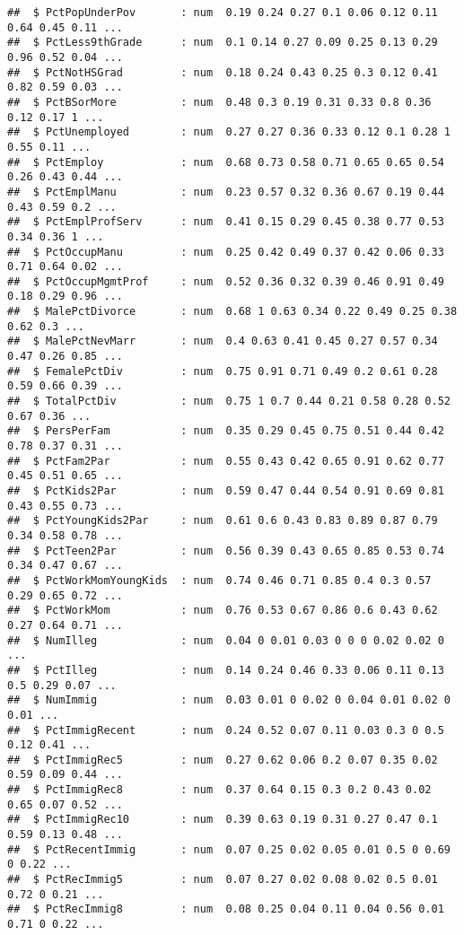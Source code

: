 \documentclass[
]{article}
\begin{document}
\begin{verbatim}
##  $ PctPopUnderPov       : num  0.19 0.24 0.27 0.1 0.06 0.12 0.11 0.64 0.45 0.11 ...
##  $ PctLess9thGrade      : num  0.1 0.14 0.27 0.09 0.25 0.13 0.29 0.96 0.52 0.04 ...
##  $ PctNotHSGrad         : num  0.18 0.24 0.43 0.25 0.3 0.12 0.41 0.82 0.59 0.03 ...
##  $ PctBSorMore          : num  0.48 0.3 0.19 0.31 0.33 0.8 0.36 0.12 0.17 1 ...
##  $ PctUnemployed        : num  0.27 0.27 0.36 0.33 0.12 0.1 0.28 1 0.55 0.11 ...
##  $ PctEmploy            : num  0.68 0.73 0.58 0.71 0.65 0.65 0.54 0.26 0.43 0.44 ...
##  $ PctEmplManu          : num  0.23 0.57 0.32 0.36 0.67 0.19 0.44 0.43 0.59 0.2 ...
##  $ PctEmplProfServ      : num  0.41 0.15 0.29 0.45 0.38 0.77 0.53 0.34 0.36 1 ...
##  $ PctOccupManu         : num  0.25 0.42 0.49 0.37 0.42 0.06 0.33 0.71 0.64 0.02 ...
##  $ PctOccupMgmtProf     : num  0.52 0.36 0.32 0.39 0.46 0.91 0.49 0.18 0.29 0.96 ...
##  $ MalePctDivorce       : num  0.68 1 0.63 0.34 0.22 0.49 0.25 0.38 0.62 0.3 ...
##  $ MalePctNevMarr       : num  0.4 0.63 0.41 0.45 0.27 0.57 0.34 0.47 0.26 0.85 ...
##  $ FemalePctDiv         : num  0.75 0.91 0.71 0.49 0.2 0.61 0.28 0.59 0.66 0.39 ...
##  $ TotalPctDiv          : num  0.75 1 0.7 0.44 0.21 0.58 0.28 0.52 0.67 0.36 ...
##  $ PersPerFam           : num  0.35 0.29 0.45 0.75 0.51 0.44 0.42 0.78 0.37 0.31 ...
##  $ PctFam2Par           : num  0.55 0.43 0.42 0.65 0.91 0.62 0.77 0.45 0.51 0.65 ...
##  $ PctKids2Par          : num  0.59 0.47 0.44 0.54 0.91 0.69 0.81 0.43 0.55 0.73 ...
##  $ PctYoungKids2Par     : num  0.61 0.6 0.43 0.83 0.89 0.87 0.79 0.34 0.58 0.78 ...
##  $ PctTeen2Par          : num  0.56 0.39 0.43 0.65 0.85 0.53 0.74 0.34 0.47 0.67 ...
##  $ PctWorkMomYoungKids  : num  0.74 0.46 0.71 0.85 0.4 0.3 0.57 0.29 0.65 0.72 ...
##  $ PctWorkMom           : num  0.76 0.53 0.67 0.86 0.6 0.43 0.62 0.27 0.64 0.71 ...
##  $ NumIlleg             : num  0.04 0 0.01 0.03 0 0 0 0.02 0.02 0 ...
##  $ PctIlleg             : num  0.14 0.24 0.46 0.33 0.06 0.11 0.13 0.5 0.29 0.07 ...
##  $ NumImmig             : num  0.03 0.01 0 0.02 0 0.04 0.01 0.02 0 0.01 ...
##  $ PctImmigRecent       : num  0.24 0.52 0.07 0.11 0.03 0.3 0 0.5 0.12 0.41 ...
##  $ PctImmigRec5         : num  0.27 0.62 0.06 0.2 0.07 0.35 0.02 0.59 0.09 0.44 ...
##  $ PctImmigRec8         : num  0.37 0.64 0.15 0.3 0.2 0.43 0.02 0.65 0.07 0.52 ...
##  $ PctImmigRec10        : num  0.39 0.63 0.19 0.31 0.27 0.47 0.1 0.59 0.13 0.48 ...
##  $ PctRecentImmig       : num  0.07 0.25 0.02 0.05 0.01 0.5 0 0.69 0 0.22 ...
##  $ PctRecImmig5         : num  0.07 0.27 0.02 0.08 0.02 0.5 0.01 0.72 0 0.21 ...
##  $ PctRecImmig8         : num  0.08 0.25 0.04 0.11 0.04 0.56 0.01 0.71 0 0.22 ...

\end{verbatim}
\end{document}
